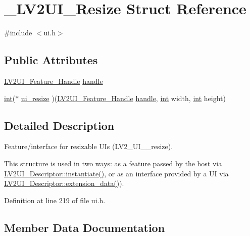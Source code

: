 \hypertarget{struct___l_v2_u_i___resize}{}\section{\+\_\+\+L\+V2\+U\+I\+\_\+\+Resize Struct Reference}
\label{struct___l_v2_u_i___resize}


{\ttfamily \#include $<$ui.\+h$>$}

\subsection*{Public Attributes}
\begin{DoxyCompactItemize}
\item 
\hyperlink{ui_8h_aee1f066da7d217c82bafa46bccbfde94}{L\+V2\+U\+I\+\_\+\+Feature\+\_\+\+Handle} \hyperlink{struct___l_v2_u_i___resize_ae2157e217898e362251e1fcd8f154203}{handle}
\item 
\hyperlink{xmltok_8h_a5a0d4a5641ce434f1d23533f2b2e6653}{int}($\ast$ \hyperlink{struct___l_v2_u_i___resize_abf3e744d681042f6504ff9e1e37da114}{ui\+\_\+resize} )(\hyperlink{ui_8h_aee1f066da7d217c82bafa46bccbfde94}{L\+V2\+U\+I\+\_\+\+Feature\+\_\+\+Handle} \hyperlink{struct___l_v2_u_i___resize_ae2157e217898e362251e1fcd8f154203}{handle}, \hyperlink{xmltok_8h_a5a0d4a5641ce434f1d23533f2b2e6653}{int} width, \hyperlink{xmltok_8h_a5a0d4a5641ce434f1d23533f2b2e6653}{int} height)
\end{DoxyCompactItemize}


\subsection{Detailed Description}
Feature/interface for resizable U\+Is (L\+V2\+\_\+\+U\+I\+\_\+\+\_\+resize).

This structure is used in two ways\+: as a feature passed by the host via \hyperlink{struct___l_v2_u_i___descriptor_a7a3bfa399c6ee276b096b31f837fc0fb}{L\+V2\+U\+I\+\_\+\+Descriptor\+::instantiate()}, or as an interface provided by a UI via \hyperlink{struct___l_v2_u_i___descriptor_a274b7f41cbcb9fdab6f936a1bcef1863}{L\+V2\+U\+I\+\_\+\+Descriptor\+::extension\+\_\+data()}). 

Definition at line 219 of file ui.\+h.



\subsection{Member Data Documentation}
